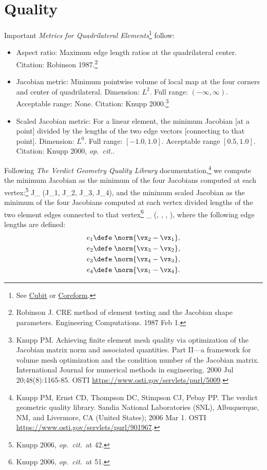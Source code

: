\documentclass[11pt, oneside]{article}   	%
\begin{document}
\section{Quality}

Important {\em Metrics for Quadrilateral Elements}\footnote{See \href{https://cubit.sandia.gov/files/cubit/16.04/help_manual/WebHelp/cubithelp.htm}{Cubit} or \href{https://coreform.com/cubit_help/mesh_generation/mesh_quality_assessment/quadrilateral_metrics.htm}{Coreform}.} follow:

\begin{itemize}
    \item Aspect ratio: Maximum edge length ratios at the quadrilateral center.  Citation: Robinson 1987.\footnote{Robinson J. CRE method of element testing and the Jacobian shape parameters. Engineering Computations. 1987 Feb 1.}
  \item Jacobian metric: Minimum pointwise volume of local map at the four corners and center of quadrilateral.  Dimension: $L^2$.  Full range: $(-\infty, \infty)$.  Acceptable range: None.  Citation: Knupp 2000.\footnote{Knupp PM. Achieving finite element mesh quality via optimization of the Jacobian matrix norm and associated quantities. Part II—a framework for volume mesh optimization and the condition number of the Jacobian matrix. International Journal for numerical methods in engineering. 2000 Jul 20;48(8):1165-85. OSTI \href{link}{https://www.osti.gov/servlets/purl/5009}.}
  \item Scaled Jacobian metric: For a linear element, the minimum Jacobian [at a point] divided by the lengths of the two edge vectors [connecting to that point].  Dimension: $L^0$.  Full range: $[-1.0, 1.0]$.  Acceptable range $[0.5, 1.0]$.  Citation: Knupp 2000, {\em op.~cit.}.
\end{itemize}

Following {\em The Verdict Geometry Quality 
Library} documentation,\footnote{Knupp PM, Ernst CD, Thompson DC, Stimpson CJ, Pebay PP. The verdict geometric quality library. Sandia National Laboratories (SNL), Albuquerque, NM, and Livermore, CA (United States); 2006 Mar 1.  OSTI \href{link}{https://www.osti.gov/servlets/purl/901967}.} we compute the minimum Jacobian as the minimum of the four Jacobians computed at each vertex:\footnote{Knupp 2006, {\em op.~cit.}~at 42.}
\be 
J_{\min}  \min(J_1, J_2, J_3, J_4),
\ee 
and the minimum scaled Jacobian as the minimum of the four Jacobians computed at 
each vertex divided lengths of the two element edges connected 
to that vertex\footnote{Knupp 2006, {\em op.~cit.}~at 51.}
\be 
{}_{\min}  \min\left(, , 
, \right),
\ee 
where the following edge lengths are defined:
\begin{align}
e_1 &\defe \; \norm{\vx_2 - \vx_1}, \\
e_2 &\defe \; \norm{\vx_3 - \vx_2}, \\
e_3 &\defe \; \norm{\vx_4 - \vx_3}, \\
e_4 &\defe \; \norm{\vx_1 - \vx_4}.
\end{align}
\end{document}

